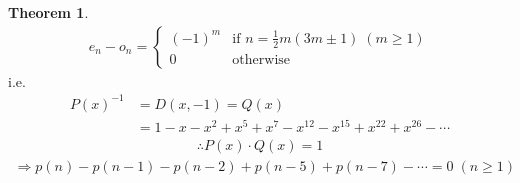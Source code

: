 \documentclass{article}
\theoremstyle{definition}
\newtheorem{thm}{Theorem}[]
\begin{document}
\begin{thm}
    \begin{align*}
        e_n - o_n = 
        \begin{cases}
            (-1)^m & \text{if } n = \frac{1}{2}m (3m\pm 1) \; (m \ge 1) \\ 
            0 & \text{otherwise}
        \end{cases}
    \end{align*}
    i.e. 
    \begin{align*}
        P(x)^{-1} &= D(x, -1) = Q(x) \\ 
        &= 1- x - x^2 + x^5 + x^7 - x^{12} -x^{15} + x^{22} + x^{26} - \cdots 
    \end{align*}
    \begin{align*}
        \therefore P(x)\cdot Q(x) = 1
    \end{align*}
    \begin{align*}
        \Rightarrow p(n) - p(n-1) - p(n-2) + p(n-5) + p(n-7) 
        - \cdots = 0 \; (n \ge 1)
    \end{align*}
\end{thm}
\end{document}
